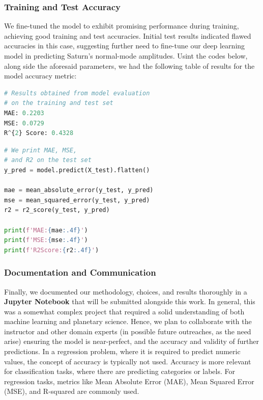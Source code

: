 \documentclass[conference]{IEEEtran}
\begin{document}
\subsubsection{Training and Test Accuracy}
We fine-tuned the model to exhibit promising performance during training, achieving good training and test accuracies. Initial test results indicated flawed accuracies in this case, suggesting further need to fine-tune our deep learning model in predicting Saturn's normal-mode amplitudes. Usint the codes below, along side the aforesaid parameters, we had the following table of results for the model accuracy metric:
\begin{lstlisting}[language=Python, caption=Model Evaluation Results, label=code:model-evaluation-results]
# Results obtained from model evaluation
# on the training and test set
MAE: 0.2203
MSE: 0.0729
R^{2} Score: 0.4328
\end{lstlisting}


\begin{lstlisting}[language=Python, caption=Evaluating Model Performance on Test Set, label=code:model-evaluation]
# We print MAE, MSE, 
# and R2 on the test set
y_pred = model.predict(X_test).flatten()

mae = mean_absolute_error(y_test, y_pred)
mse = mean_squared_error(y_test, y_pred)
r2 = r2_score(y_test, y_pred)

print(f'MAE:{mae:.4f}')
print(f'MSE:{mse:.4f}')
print(f'R2Score:{r2:.4f}')
\end{lstlisting}

\subsubsection{Documentation and Communication} 
Finally, we documented our methodology, choices, and results thoroughly in a \textbf{Jupyter Notebook} that will be submitted alongside this work. In general, this was a somewhat complex project that required a solid understanding of both machine learning and planetary science. Hence, we plan to collaborate with the instructor and other domain experts (in possible future outreaches, as the need arise) ensuring the model is near-perfect, and the accuracy and validity of further predictions.
In a regression problem, where it is required to predict numeric values, the concept of accuracy is typically not used. Accuracy is more relevant for classification tasks, where there are predicting categories or labels. For regression tasks, metrics like Mean Absolute Error (MAE), Mean Squared Error (MSE), and R-squared are commonly used.
\end{document}
